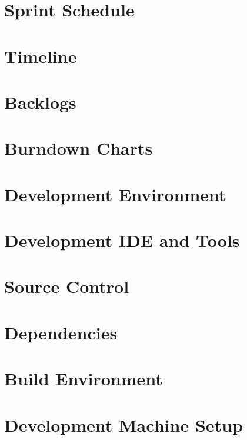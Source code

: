 \section{Sprint Schedule}

\section{Timeline}

\section{Backlogs}

\section{Burndown Charts}


\section{Development Environment}


\section{Development IDE and Tools}

\section{Source  Control}

\section{Dependencies}

\section{Build  Environment}

\section{Development Machine Setup}
